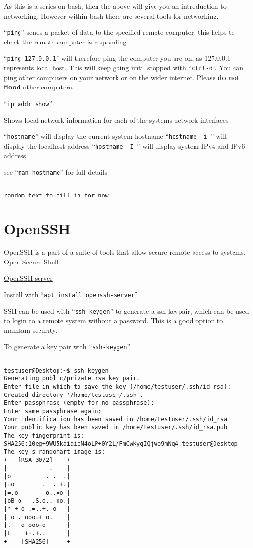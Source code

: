 \documentclass{extbook}
\begin{document}
As this is a series on bash,  then the above will give you an introduction to networking. However within bash there are several tools for networking.

``\verb|ping|'' sends a packet of data to the specified remote computer, this helps to check the remote computer is responding.

``\verb|ping 127.0.0.1|'' will therefore ping the computer you are on,  as 127.0.0.1 represents local host. This will keep going until stopped with ``\verb|ctrl-d|''. You can ping other computers on your network or on the wider internet. Please \textbf{do not flood} other computers.

``\verb|ip addr show|''

Shows local network information for each of the systems network interfaces

``\verb|hostname|'' will display the current system hostname
``\verb|hostname -i |'' will display the localhost address
``\verb|hostname -I |'' will display system IPv4 and IPv6 address

see ``\verb|man hostname|'' for full details

\begin{verbatim}

random text to fill in for now

\end{verbatim}



\section{OpenSSH}

OpenSSH is a part of a suite of tools that allow secure remote access to systems. Open Secure Shell.

\href{https://www.openssh.com/}{OpenSSH server}

Install with ``\verb|apt install openssh-server|''

SSH can be used with ``\verb|ssh-keygen|'' to generate a ssh keypair, which can be used to login to a remote system without a password. This is a good option to maintain security.

To generate a key pair with ``\verb|ssh-keygen|''


\begin{verbatim}

testuser@Desktop:~$ ssh-keygen
Generating public/private rsa key pair.
Enter file in which to save the key (/home/testuser/.ssh/id_rsa):
Created directory '/home/testuser/.ssh'.
Enter passphrase (empty for no passphrase):
Enter same passphrase again:
Your identification has been saved in /home/testuser/.ssh/id_rsa
Your public key has been saved in /home/testuser/.ssh/id_rsa.pub
The key fingerprint is:
SHA256:10eg+9WU5kaiaicN4oLP+0Y2L/FmCwKygIQjwo9mNq4 testuser@Desktop
The key's randomart image is:
+---[RSA 3072]----+
|            .    |
|o          . .  .|
|=o        .  ..+.|
|=.o        o..=o |
|oB o   .S.o.. oo.|
|* + o .=..+. o.  |
| o . ooo=+ o.    |
|.   o ooo=o      |
|E    ++.+..      |
+----[SHA256]-----+

\end{verbatim}
\end{document}
